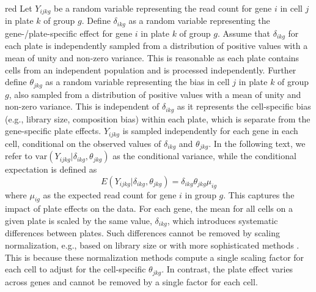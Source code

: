 \documentclass[oupdraft]{bio}
\begin{document}
\begin{color}{red}
Let $Y_{ijkg}$ be a random variable representing the read count for gene $i$ in cell $j$ in plate $k$ of group $g$.
Define $\delta_{ikg}$ as a random variable representing the gene-/plate-specific effect for gene $i$ in plate $k$ of group $g$.
Assume that $\delta_{ikg}$ for each plate is independently sampled from a distribution of positive values with a mean of unity and non-zero variance.
This is reasonable as each plate contains cells from an independent population and is processed independently.
Further define $\theta_{jkg}$ as a random variable representing the bias in cell $j$ in plate $k$ of group $g$, also sampled from a distribution of positive values with a mean of unity and non-zero variance.
This is independent of $\delta_{ikg}$ as it represents the cell-specific bias (e.g., library size, composition bias) within each plate, which is separate from the gene-specific plate effects.
$Y_{ijkg}$ is sampled independently for each gene in each cell, conditional on the observed values of $\delta_{ikg}$ and $\theta_{jkg}$.
In the following text, we refer to $\mbox{var}(Y_{ijkg}|\delta_{ikg},\theta_{jkg})$ as the conditional variance, while the conditional expectation is defined as
\[
    E(Y_{ijkg}|\delta_{ikg},\theta_{jkg}) = \delta_{ikg}\theta_{jkg}\mu_{ig} 
\]
where $\mu_{ig}$ as the expected read count for gene $i$ in group $g$.
This captures the impact of plate effects on the data.
For each gene, the mean for all cells on a given plate is scaled by the same value, $\delta_{ikg}$, which introduces systematic differences between plates.
Such differences cannot be removed by scaling normalization, e.g., based on library size or with more sophisticated methods \citep{anders2010differential,robinson2010scaling}.
This is because these normalization methods compute a single scaling factor for each cell to adjust for the cell-specific $\theta_{jkg}$.
In contrast, the plate effect varies across genes and cannot be removed by a single factor for each cell.
\end{color}


\end{document}

